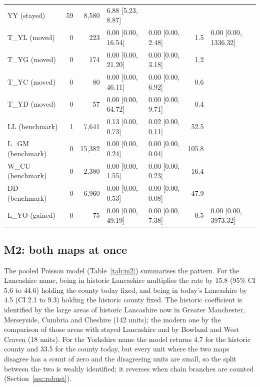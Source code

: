 \documentclass[11pt,a4paper]{article}
\begin{document}
\begin{table}[tbp]
\begin{tabular}{lrrllrl}
\quad YY (stayed) & 59 & 8,580 & 6.88 [5.23, 8.87] &  &  & \\
\quad T\_YL (moved) & 0 & 223 & 0.00 [0.00, 16.54] & 0.00 [0.00, 2.48] & 1.5 & 0.00 [0.00, 1336.32]\\
\quad T\_YG (moved) & 0 & 174 & 0.00 [0.00, 21.20] & 0.00 [0.00, 3.18] & 1.2 & \\
\quad T\_YC (moved) & 0 & 80 & 0.00 [0.00, 46.11] & 0.00 [0.00, 6.92] & 0.6 & \\
\quad T\_YD (moved) & 0 & 57 & 0.00 [0.00, 64.72] & 0.00 [0.00, 9.71] & 0.4 & \\
\quad LL (benchmark) & 1 & 7,641 & 0.13 [0.00, 0.73] & 0.02 [0.00, 0.11] & 52.5 & \\
\quad L\_GM (benchmark) & 0 & 15,382 & 0.00 [0.00, 0.24] & 0.00 [0.00, 0.04] & 105.8 & \\
\quad W\_CU (benchmark) & 0 & 2,380 & 0.00 [0.00, 1.55] & 0.00 [0.00, 0.23] & 16.4 & \\
\quad DD (benchmark) & 0 & 6,960 & 0.00 [0.00, 0.53] & 0.00 [0.00, 0.08] & 47.9 & \\
\quad L\_YO (gained) & 0 & 75 & 0.00 [0.00, 49.19] & 0.00 [0.00, 7.38] & 0.5 & 0.00 [0.00, 3973.32]\\
\bottomrule\end{tabular}\end{table}

\subsection{M2: both maps at once}
The pooled Poisson model (Table~\ref{tab:m2}) summarises the pattern. For the Lancashire name, being in historic Lancashire multiplies the rate by 15.8 (95\% CI 5.6 to 44.6) holding the county today fixed, and being in today's Lancashire by 4.5 (CI 2.1 to 9.3) holding the historic county fixed. The historic coefficient is identified by the large areas of historic Lancashire now in Greater Manchester, Merseyside, Cumbria and Cheshire (142 units); the modern one by the comparison of those areas with stayed Lancashire and by Bowland and West Craven (18 units). For the Yorkshire name the model returns 4.7 for the historic county and 33.5 for the county today, but every unit where the two maps disagree has a count of zero and the disagreeing units are small, so the split between the two is weakly identified; it reverses when chain branches are counted (Section~\ref{sec:robust}).
\end{document}
